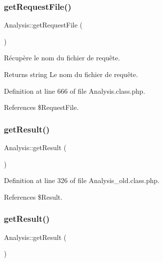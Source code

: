 \subsubsection{\texorpdfstring{get\+Request\+File()}{getRequestFile()}\hspace{0.1cm}{\footnotesize\ttfamily [2/2]}}
{\footnotesize\ttfamily Analysis\+::get\+Request\+File (\begin{DoxyParamCaption}{ }\end{DoxyParamCaption})}

Récupère le nom du fichier de requête.

\begin{DoxyReturn}{Returns}
string Le nom du fichier de requête. 
\end{DoxyReturn}


Definition at line 666 of file Analysis.\+class.\+php.



References \$\+Request\+File.

\mbox{\label{class_analysis_ad7ad2fad370d3fa72512d3846f33618d}} 
\subsubsection{\texorpdfstring{get\+Result()}{getResult()}\hspace{0.1cm}{\footnotesize\ttfamily [1/2]}}
{\footnotesize\ttfamily Analysis\+::get\+Result (\begin{DoxyParamCaption}{ }\end{DoxyParamCaption})}



Definition at line 326 of file Analysis\+\_\+old.\+class.\+php.



References \$\+Result.

\mbox{\label{class_analysis_ad7ad2fad370d3fa72512d3846f33618d}} 
\subsubsection{\texorpdfstring{get\+Result()}{getResult()}\hspace{0.1cm}{\footnotesize\ttfamily [2/2]}}
{\footnotesize\ttfamily Analysis\+::get\+Result (\begin{DoxyParamCaption}{ }\end{DoxyParamCaption})}

